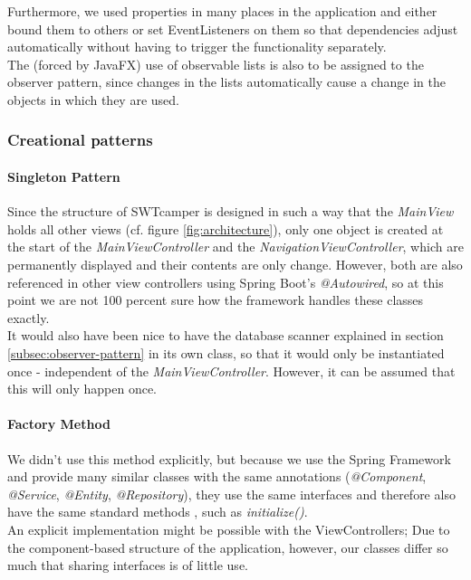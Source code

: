 Furthermore, we used properties in many places in the application and either bound them to others or set EventListeners on them so that dependencies adjust automatically without having to trigger the functionality separately. \\
The (forced by JavaFX) use of observable lists is also to be assigned to the observer pattern, since changes in the lists automatically cause a change in the objects in which they are used.

\subsubsection{Creational patterns}

\paragraph{Singleton Pattern}
Since the structure of SWTcamper is designed in such a way that the \textit{MainView} holds all other views (cf. figure \ref{fig:architecture}), only one object is created at the start of the \textit{MainViewController} and the \textit{NavigationViewController}, which are permanently displayed and their contents are only change. However, both are also referenced in other view controllers using Spring Boot's \textit{@Autowired}, so at this point we are not 100 percent sure how the framework handles these classes exactly. \\
It would also have been nice to have the database scanner explained in section \ref{subsec:observer-pattern} in its own class, so that it would only be instantiated once - independent of the \textit{MainViewController}. However, it can be assumed that this will only happen once.

\paragraph{Factory Method}
We didn't use this method explicitly, but because we use the Spring Framework and provide many similar classes with the same annotations (\textit{@Component}, \textit{@Service}, \textit{@Entity}, \textit{@Repository}), they use the same interfaces and therefore also have the same standard methods , such as \textit{initialize()}. \\
An explicit implementation might be possible with the ViewControllers; Due to the component-based structure of the application, however, our classes differ so much that sharing interfaces is of little use.

